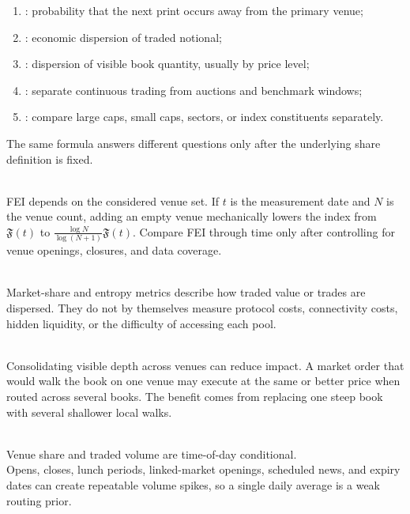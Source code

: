 \begin{taxonomy} 
\begin{enumerate}[label=\roman*.]
\setlength{\itemsep}{0pt}
\item {}: probability that the next print occurs away from the primary venue;
\item {}: economic dispersion of traded notional;
\item {}: dispersion of visible book quantity, usually by price level;
\item {}: separate continuous trading from auctions and benchmark windows;
\item {}: compare large caps, small caps, sectors, or index constituents separately.
\end{enumerate}
The same formula answers different questions only after the underlying share definition is fixed.
\end{taxonomy}

\begin{caveat} \\
FEI depends on the considered venue set. If $t$ is the measurement date and $N$ is the venue count, adding an empty venue mechanically lowers the index from $\mathfrak{F}(t)$ to $\frac{\log N}{\log(N+1)}\mathfrak{F}(t)$. Compare FEI through time only after controlling for venue openings, closures, and data coverage.
\end{caveat}

\begin{caveat} \\
Market-share and entropy metrics describe how traded value or trades are dispersed. They do not by themselves measure protocol costs, connectivity costs, hidden liquidity, or the difficulty of accessing each pool.
\end{caveat}

\begin{mechanism} \\
Consolidating visible depth across venues can reduce impact. A market order that would walk the book on one venue may execute at the same or better price when routed across several books. The benefit comes from replacing one steep book with several shallower local walks.
\end{mechanism}

\begin{caveat} \\
Venue share and traded volume are time-of-day conditional.\\
Opens, closes, lunch periods, linked-market openings, scheduled news, and expiry dates can create repeatable volume spikes, so a single daily average is a weak routing prior.
\end{caveat}

